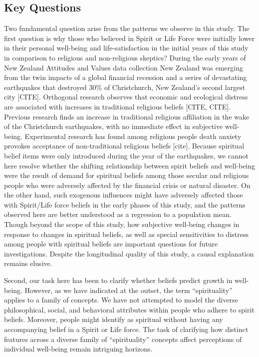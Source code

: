 \documentclass[
  english,
  man]{apa6}
\begin{document}
\hypertarget{key-questions}{%
\subsection{Key Questions}\label{key-questions}}

Two fundamental question arise from the patterns we observe in this study. The first question is why those who believed in Spirit or Life Force were initially lower in their personal well-being and life-satisfaction in the initial years of this study in comparison to religious and non-religious skeptics? During the early years of New Zealand Attitudes and Values data collection New Zealand was emerging from the twin impacts of a global financial recession and a series of devastating earthquakes that destroyed 30\% of Christchurch, New Zealand's second largest city {[}CITE{]}. Orthogonal research observes that economic and ecological distress are associated with increases in traditional religious beliefs {[}CITE, CITE{]}. Previous research finds an increase in traditional religious affiliation in the wake of the Christchurch earthquakes, with no immediate effect in subjective well-being. Experimental research has found among religious people death anxiety provokes acceptance of non-traditional religious beliefs {[}cite{]}. Because spiritual belief items were only introduced during the year of the earthquakes, we cannot here resolve whether the shifting relationship between spirit beliefs and well-being were the result of demand for spiritual beliefs among those secular and religious people who were adversely affected by the financial crisis or natural disaster. On the other hand, such exogenous influences might have adversely affected those with Spirit/Life force beliefs in the early phases of this study, and the patterns observed here are better understood as a regression to a population mean. Though beyond the scope of this study, how subjective well-being changes in response to changes in spiritual beliefs, as well as special sensitivities to distress among people with spiritual beliefs are important questions for future investigations. Despite the longitudinal quality of this study, a causal explanation remains elusive.

Second, our task here has been to clarify whether beliefs predict growth in well-being. However, as we have indicated at the outset, the term \enquote{spirituality} applies to a family of concepts. We have not attempted to model the diverse philosophical, social, and behavioral attributes within people who adhere to spirit beliefs. Moreover, people might identify as spiritual without having any accompanying belief in a Spirit or Life force. The task of clarifying how distinct features across a diverse family of \enquote{spirituality} concepts affect perceptions of individual well-being remain intriguing horizons.
\end{document}
